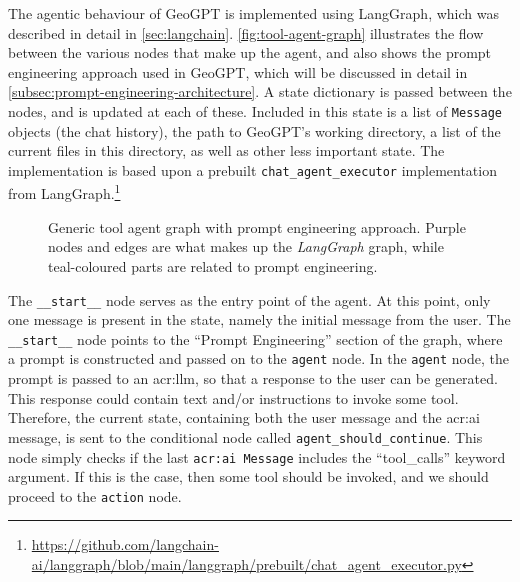 The agentic behaviour of GeoGPT is implemented using LangGraph, which was described in detail in \autoref{sec:langchain}. \autoref{fig:tool-agent-graph} illustrates the flow between the various nodes that make up the agent, and also shows the prompt engineering approach used in GeoGPT, which will be discussed in detail in \autoref{subsec:prompt-engineering-architecture}. A state dictionary is passed between the nodes, and is updated at each of these. Included in this state is a list of \texttt{Message} objects (the chat history), the path to GeoGPT's working directory, a list of the current files in this directory, as well as other less important state. The implementation is based upon a prebuilt \texttt{chat\_agent\_executor} implementation from LangGraph.\footnote{\url{https://github.com/langchain-ai/langgraph/blob/main/langgraph/prebuilt/chat_agent_executor.py}}

\begin{figure}
    \centering
    \caption[Generic tool agent graph with prompt engineering approach]{Generic tool agent graph with prompt engineering approach. Purple nodes and edges are what makes up the \textit{LangGraph} graph, while teal-coloured parts are related to prompt engineering.}
    \label{fig:tool-agent-graph}
\end{figure}

The \texttt{\_\_start\_\_} node serves as the entry point of the agent. At this point, only one message is present in the state, namely the initial message from the user. The \texttt{\_\_start\_\_} node points to the \enquote{Prompt Engineering} section of the graph, where a prompt is constructed and passed on to the \texttt{agent} node. In the \texttt{agent} node, the prompt is passed to an \acrshort{acr:llm}, so that a response to the user can be generated. This response could contain text and/or instructions to invoke some tool. Therefore, the current state, containing both the user message and the \acrshort{acr:ai} message, is sent to the conditional node called \texttt{agent\_should\_continue}. This node simply checks if the last \texttt{\acrshort{acr:ai} Message} includes the \enquote{tool\_calls} keyword argument. If this is the case, then some tool should be invoked, and we should proceed to the \texttt{action} node.

